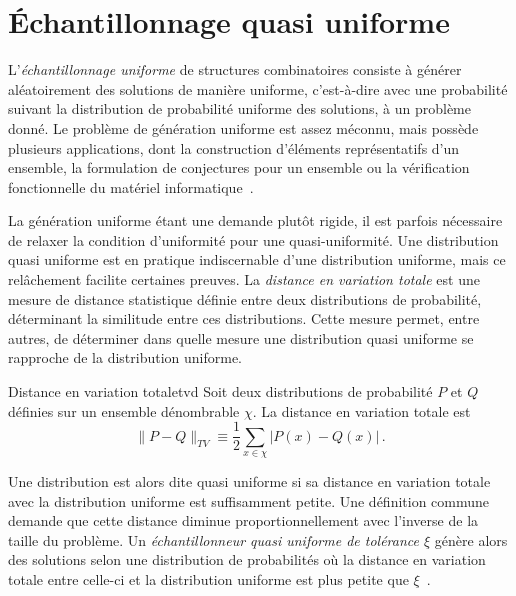 
\section{Échantillonnage quasi uniforme}
\label{sec:echantillonnage-quasi-uniforme}

L'\textit{échantillonnage uniforme} de structures combinatoires consiste à générer aléatoirement des solutions de manière uniforme, c'est-à-dire avec une probabilité suivant la distribution de probabilité uniforme des solutions, à un problème donné. Le problème de génération uniforme est assez méconnu, mais possède plusieurs applications, dont la construction d'éléments représentatifs d'un ensemble, la formulation de conjectures pour un ensemble ou la vérification fonctionnelle du matériel informatique~\cite{jerrumFastUniformGeneration1990, chakrabortyScalableNearlyUniform2013}.

La génération uniforme étant une demande plutôt rigide, il est parfois nécessaire de relaxer la condition d'uniformité pour une quasi-uniformité. Une distribution quasi uniforme est en pratique indiscernable d'une distribution uniforme, mais ce relâchement facilite certaines preuves. La \textit{distance en variation totale} est une mesure de distance statistique définie entre deux distributions de probabilité, déterminant la similitude entre ces distributions. Cette mesure permet, entre autres, de déterminer dans quelle mesure une distribution quasi uniforme se rapproche de la distribution uniforme.

\begin{subdefinition}{Distance en variation totale}{tvd}
    Soit deux distributions de probabilité $P$ et $Q$ définies sur un ensemble dénombrable $\chi$. La distance en variation totale est
    \begin{equation*}
        \lVert P - Q \rVert_{TV} \equiv \frac{1}{2} \sum_{x \in \chi} \lvert P(x) - Q(x) \rvert \,. 
    \end{equation*}
\end{subdefinition}

Une distribution est alors dite quasi uniforme si sa distance en variation totale avec la distribution uniforme est suffisamment petite. Une définition commune demande que cette distance diminue proportionnellement avec l'inverse de la taille du problème. Un \textit{échantillonneur quasi uniforme de tolérance $\xi$} génère alors des solutions selon une distribution de probabilités où la distance en variation totale entre celle-ci et la distribution uniforme est plus petite que $\xi$~\cite{jerrumCountingSamplingIntegrating2003}.

